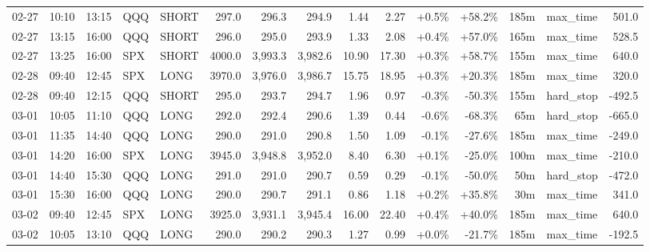 \documentclass[11pt,a4paper,twoside]{article}
\begin{document}
\begin{landscape}
\begin{center}
\begin{longtable}{>{\color{txtmain}}l l l l l r r r r r r r r >{\color{txtmain}}l r}
02-27 & 10:10 & 13:15 & QQQ & SHORT & 297.0 & 296.3 & 294.9 & 1.44 & 2.27 & \textcolor{wingreen}{+0.5\%} & \textcolor{wingreen}{+58.2\%} & 185m & max\_time & \textcolor{wingreen}{501.0} \\
02-27 & 13:15 & 16:00 & QQQ & SHORT & 296.0 & 295.0 & 293.9 & 1.33 & 2.08 & \textcolor{wingreen}{+0.4\%} & \textcolor{wingreen}{+57.0\%} & 165m & max\_time & \textcolor{wingreen}{528.5} \\
02-27 & 13:25 & 16:00 & SPX & SHORT & 4000.0 & 3,993.3 & 3,982.6 & 10.90 & 17.30 & \textcolor{wingreen}{+0.3\%} & \textcolor{wingreen}{+58.7\%} & 155m & max\_time & \textcolor{wingreen}{640.0} \\
02-28 & 09:40 & 12:45 & SPX & LONG & 3970.0 & 3,976.0 & 3,986.7 & 15.75 & 18.95 & \textcolor{wingreen}{+0.3\%} & \textcolor{wingreen}{+20.3\%} & 185m & max\_time & \textcolor{wingreen}{320.0} \\
02-28 & 09:40 & 12:15 & QQQ & SHORT & 295.0 & 293.7 & 294.7 & 1.96 & 0.97 & \textcolor{lossred}{-0.3\%} & \textcolor{lossred}{-50.3\%} & 155m & hard\_stop & \textcolor{lossred}{-492.5} \\
03-01 & 10:05 & 11:10 & QQQ & LONG & 292.0 & 292.4 & 290.6 & 1.39 & 0.44 & \textcolor{lossred}{-0.6\%} & \textcolor{lossred}{-68.3\%} & 65m & hard\_stop & \textcolor{lossred}{-665.0} \\
03-01 & 11:35 & 14:40 & QQQ & LONG & 290.0 & 291.0 & 290.8 & 1.50 & 1.09 & \textcolor{lossred}{-0.1\%} & \textcolor{lossred}{-27.6\%} & 185m & max\_time & \textcolor{lossred}{-249.0} \\
03-01 & 14:20 & 16:00 & SPX & LONG & 3945.0 & 3,948.8 & 3,952.0 & 8.40 & 6.30 & \textcolor{wingreen}{+0.1\%} & \textcolor{lossred}{-25.0\%} & 100m & max\_time & \textcolor{lossred}{-210.0} \\
03-01 & 14:40 & 15:30 & QQQ & LONG & 291.0 & 291.0 & 290.7 & 0.59 & 0.29 & \textcolor{lossred}{-0.1\%} & \textcolor{lossred}{-50.0\%} & 50m & hard\_stop & \textcolor{lossred}{-472.0} \\
03-01 & 15:30 & 16:00 & QQQ & LONG & 290.0 & 290.7 & 291.1 & 0.86 & 1.18 & \textcolor{wingreen}{+0.2\%} & \textcolor{wingreen}{+35.8\%} & 30m & max\_time & \textcolor{wingreen}{341.0} \\
03-02 & 09:40 & 12:45 & SPX & LONG & 3925.0 & 3,931.1 & 3,945.4 & 16.00 & 22.40 & \textcolor{wingreen}{+0.4\%} & \textcolor{wingreen}{+40.0\%} & 185m & max\_time & \textcolor{wingreen}{640.0} \\
03-02 & 10:05 & 13:10 & QQQ & LONG & 290.0 & 290.2 & 290.3 & 1.27 & 0.99 & \textcolor{wingreen}{+0.0\%} & \textcolor{lossred}{-21.7\%} & 185m & max\_time & \textcolor{lossred}{-192.5} \\

\end{longtable}
\end{center}
\end{landscape}
\end{document}
